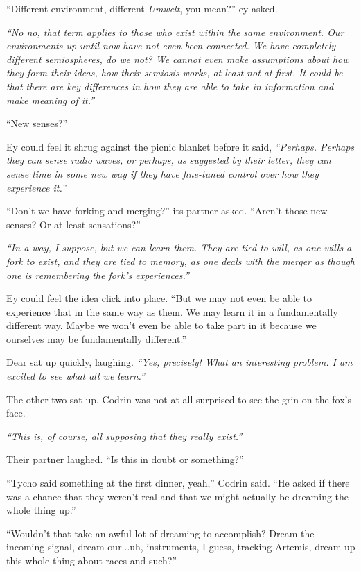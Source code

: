 ``Different environment, different \emph{Umwelt}, you mean?'' ey asked.

\emph{``No no, that term applies to those who exist within the same environment. Our environments up until now have not even been connected. We have completely different semiospheres, do we not? We cannot even make assumptions about how they form their ideas, how their semiosis works, at least not at first. It could be that there are key differences in how they are able to take in information and make meaning of it.''}

``New senses?''

Ey could feel it shrug against the picnic blanket before it said, \emph{``Perhaps. Perhaps they can sense radio waves, or perhaps, as suggested by their letter, they can sense time in some new way if they have fine-tuned control over how they experience it.''}

``Don't we have forking and merging?'' its partner asked. ``Aren't those new senses? Or at least sensations?''

\emph{``In a way, I suppose, but we can learn them. They are tied to will, as one wills a fork to exist, and they are tied to memory, as one deals with the merger as though one is remembering the fork's experiences.''}

Ey could feel the idea click into place. ``But we may not even be able to experience that in the same way as them. We may learn it in a fundamentally different way. Maybe we won't even be able to take part in it because we ourselves may be fundamentally different.''

Dear sat up quickly, laughing. \emph{``Yes, precisely! What an interesting problem. I am excited to see what all we learn.''}

The other two sat up. Codrin was not at all surprised to see the grin on the fox's face.

\emph{``This is, of course, all supposing that they really exist.''}

Their partner laughed. ``Is this in doubt or something?''

``Tycho said something at the first dinner, yeah,'' Codrin said. ``He asked if there was a chance that they weren't real and that we might actually be dreaming the whole thing up.''

``Wouldn't that take an awful lot of dreaming to accomplish? Dream the incoming signal, dream our...uh, instruments, I guess, tracking Artemis, dream up this whole thing about races and such?''


